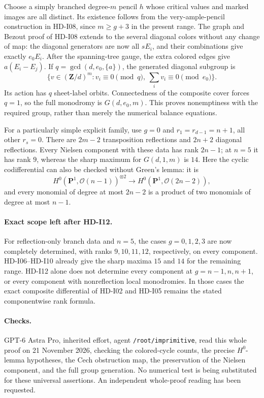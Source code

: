 Choose a simply branched degree-$m$ pencil $h$ whose critical values and
marked images are all distinct.  Its existence follows from the
very-ample-pencil construction in HD-I08, since $m\geq g+3$ in the
present range.  The graph and Bezout proof of HD-I08 extends to the
several diagonal colors without any change of map: the diagonal
generators are now all $sE_i$, and their combinations give exactly
$e_0E_i$.  After the spanning-tree gauge, the extra colored edges give
$a(E_i-E_j)$.  If
$q=\gcd(d,e_0,\{a\})$, the generated diagonal subgroup is
\[
 \{v\in(\mathbf Z/d)^m:
       v_i\equiv0\pmod q,\ \sum_i v_i\equiv0\pmod{e_0}\}.
\]
Its action has $q$ sheet-label orbits.  Connectedness of the composite
cover forces $q=1$, so the full monodromy is $G(d,e_0,m)$.
This proves nonemptiness with the required group, rather than merely
the numerical balance equations.

For a particularly simple explicit family, use $g=0$ and
$r_1=r_{d-1}=n+1$, all other $r_s=0$.  There are $2m-2$ transposition
reflections and $2n+2$ diagonal reflections.  Every Nielsen component
with these data has rank $2n-1$; at $n=5$ it has rank $9$, whereas the
sharp maximum for $G(d,1,m)$ is $14$.
Here the cyclic codifferential can also be checked without Green's
lemma: it is
\[
 H^0(\mathbf P^1,\mathcal O(n-1))^{\otimes2}
 \longrightarrow H^0(\mathbf P^1,\mathcal O(2n-2)),
\]
and every monomial of degree at most $2n-2$ is a product of two
monomials of degree at most $n-1$.

\paragraph{Exact scope left after HD-I12.}
For reflection-only branch data and $n=5$, the cases $g=0,1,2,3$
are now completely determined, with ranks $9,10,11,12$, respectively,
on every component.  HD-I06--HD-I10 already give the sharp maxima
$15$ and $14$ for the remaining range.  HD-I12 alone does not determine
every component at $g=n-1,n,n+1$, or every component with nonreflection
local monodromies.  In those cases the exact composite differential of
HD-I02 and HD-I05 remains the stated componentwise rank formula.

\paragraph{Checks.}
GPT-6 Astra Pro, inherited effort, agent \texttt{/root/imprimitive},
read this whole proof on 21 November 2026, checking the colored-cycle
counts, the precise $H^0$-lemma hypotheses, the Cech obstruction map,
the preservation of the Nielsen component, and the full group
generation.  No numerical test is being substituted for these
universal assertions.  An independent whole-proof reading has been
requested.
